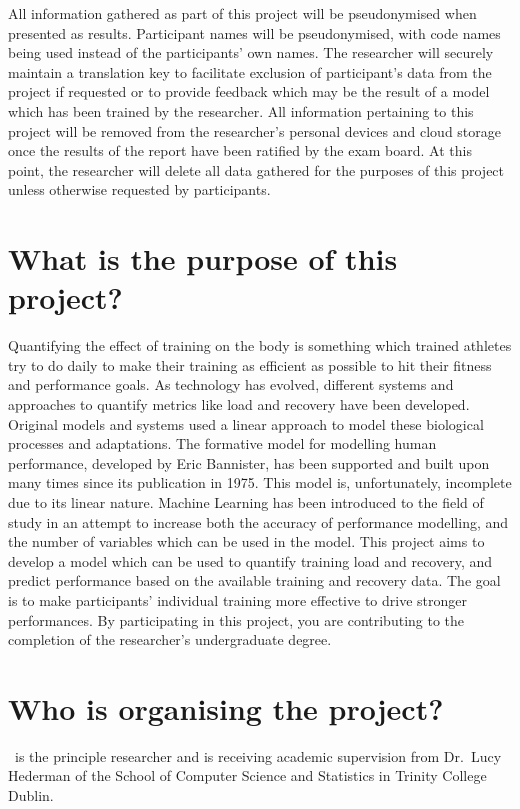 All information gathered as part of this project will be pseudonymised when presented as results. Participant names will be pseudonymised, with code names being used instead of the participants' own names. The researcher will securely maintain a translation key to facilitate exclusion of participant's data from the project if requested or to provide feedback which may be the result of a model which has been trained by the researcher. All information pertaining to this project will be removed from the researcher's personal devices and cloud storage once the results of the report have been ratified by the exam board. At this point, the researcher will delete all data gathered for the purposes of this project unless otherwise requested by participants.

\section*{What is the purpose of this project?}
Quantifying the effect of training on the body is something which trained athletes try to do daily to make their training as efficient as possible to hit their fitness and performance goals. As technology has evolved, different systems and approaches to quantify metrics like load and recovery have been developed. Original models and systems used a linear approach to model these biological processes and adaptations. The formative model for modelling human performance, developed by Eric Bannister, has been supported and built upon many times since its publication in 1975. This model is, unfortunately, incomplete due to its linear nature. Machine Learning has been introduced to the field of study in an attempt to increase both the accuracy of performance modelling, and the number of variables which can be used in the model. This project aims to develop a model which can be used to quantify training load and recovery, and predict performance based on the available training and recovery data. The goal is to make participants' individual training more effective to drive stronger performances.
By participating in this project, you are contributing to the completion of the researcher's undergraduate degree.
\section*{Who is organising the project?}
\authorname~is the principle researcher and is receiving academic supervision from Dr.~Lucy Hederman of the School of Computer Science and Statistics in Trinity College Dublin.
